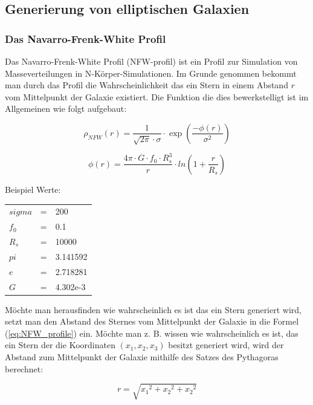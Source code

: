 \subsection{Generierung von elliptischen Galaxien}
\subsubsection{Das Navarro-Frenk-White Profil}

Das Navarro-Frenk-White Profil (NFW-profil) ist ein Profil zur Simulation
von Masseverteilungen in N-Körper-Simulationen. Im Grunde genommen bekommt man durch das Profil die
Wahrscheinlichkeit das ein Stern in einem Abstand \( r \) vom Mittelpunkt der
Galaxie existiert.
Die Funktion die dies bewerkstelligt ist im Allgemeinen wie folgt aufgebaut:

\begin{equation} \label{eq:NFW_profile}
  \rho_{NFW}(r) = \frac{ 1 }{ \sqrt{ 2 \pi } \cdot \sigma } \cdot
  \exp \left( \frac{ -\phi(r) }{ \sigma^{ 2 } } \right)
\end{equation}

\begin{equation*}
  \phi(r) = \frac{ 4\pi \cdot G \cdot f_{0} \cdot R_{s}^3 }{ r } \cdot
  ln{ \left( 1 + \frac{ r }{ R_{s} } \right) }
\end{equation*}

Beispiel Werte:

\begin{tabular}{l l l}
  \( sigma \) & = & 200 \\
  \( f_0 \) & = & 0.1 \\
  \( R_s \) & = & 10000 \\
  \( pi \) & = & 3.141592 \\
  \( e \) & = & 2.718281 \\
  \( G \) & = & 4.302e-3 \\
\end{tabular}

Möchte man herausfinden wie wahrscheinlich es ist das ein Stern generiert wird,
setzt man den Abstand des Sternes vom Mittelpunkt der Galaxie in die Formel
(\ref{eq:NFW_profile}) ein. Möchte man z. B. wissen wie wahrscheinlich es ist,
das ein Stern der die Koordinaten \( (x_{1}, x_{2}, x_{3}) \) besitzt generiert
wird, wird der Abstand zum Mittelpunkt der Galaxie mithilfe des Satzes des
Pythagoras berechnet:

\begin{equation}
  r = \sqrt{ {x_{1}}^2 + {x_{2}}^2 + {x_{2}}^2 }
\end{equation}

